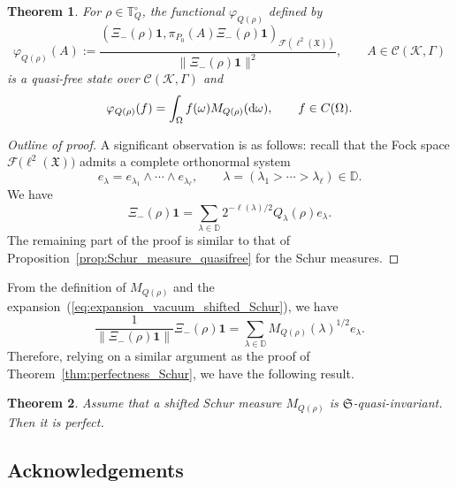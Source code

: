 \documentclass[pdftex]{sigma}
\numberwithin{equation}{section}
\newtheorem{Theorem}{Theorem}[section]
\newcommand{\mfrak}[1]{\mathfrak{#1}}
\newcommand{\mcal}[1]{\mathcal{#1}}
\newcommand{\mbb}[1]{\mathbb{#1}}
\begin{document}
\begin{Theorem}For $\rho\in\mbb{T}_{Q}^{\circ}$, the functional $\varphi_{Q(\rho)}$ defined by
\begin{equation*}
\varphi_{Q(\rho)}(A):=\frac{(\Xi_{-}(\rho)\bm{1},\pi_{P_{0}}(A)\Xi_{-}(\rho)\bm{1})_{\mcal{F}(\ell^{2} (\mfrak{X}))}}{\|\Xi_{-}(\rho)\bm{1}\|^{2}},\qquad A\in \mcal{C}(\mcal{K},\Gamma)
\end{equation*}
is a quasi-free state over $\mcal{C}(\mcal{K},\Gamma)$ and
\begin{equation*}
	\varphi_{Q(\rho)}(f)=\int_{\Omega}f(\omega)M_{Q(\rho)}({\rm d}\omega),\qquad f\in C(\Omega).
\end{equation*}
\end{Theorem}
\begin{proof}[Outline of proof]
A significant observation is as follows:
recall that the Fock space $\mcal{F}\big(\ell^{2}(\mfrak{X})\big)$ admits a complete orthonormal system
\begin{equation*}
	e_{\lambda}=e_{\lambda_{1}}\wedge\cdots \wedge e_{\lambda_{\ell}},\qquad \lambda=(\lambda_{1}>\cdots>\lambda_{\ell})\in\mbb{D}.
\end{equation*}
We have \cite[Proposition~3.2]{Matsumoto2005}
\begin{equation}\label{eq:expansion_vacuum_shifted_Schur}
	\Xi_{-}(\rho)\bm{1}=\sum_{\lambda\in\mbb{D}}2^{-\ell(\lambda)/2}Q_{\lambda}(\rho)e_{\lambda}.
\end{equation}
The remaining part of the proof is similar to that of Proposition~\ref{prop:Schur_measure_quasifree} for the Schur measures.
\end{proof}

From the definition of $M_{Q(\rho)}$ and the expansion~(\ref{eq:expansion_vacuum_shifted_Schur}), we have
\begin{equation*}
	\frac{1}{\|\Xi_{-}(\rho)\bm{1}\|}\Xi_{-}(\rho)\bm{1}=\sum_{\lambda\in\mbb{D}}M_{Q(\rho)}(\lambda)^{1/2}e_{\lambda}.
\end{equation*}
Therefore, relying on a similar argument as the proof of Theorem~\ref{thm:perfectness_Schur}, we have the following result.
\begin{Theorem}
Assume that a shifted Schur measure $M_{Q(\rho)}$ is $\mfrak{S}$-quasi-invariant. Then it is perfect.
\end{Theorem}

\subsection*{Acknowledgements}
\end{document}
